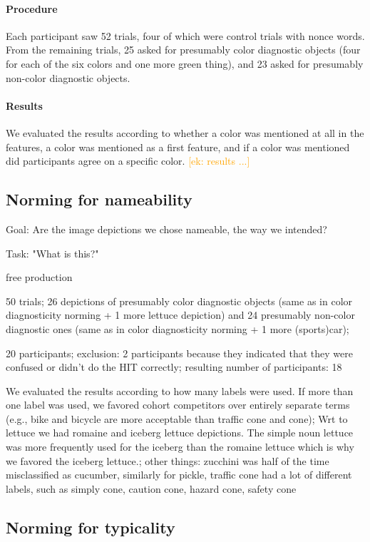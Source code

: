 \documentclass[a4paper,man,floatsintext,natbib,donotrepeattitle]{apa6}
\newcommand{\ek}[1]{\textcolor{Orange}{[ek: #1]}}
\begin{document}
\paragraph{Procedure}
Each participant saw 52 trials, four of which were control trials with nonce words. From the remaining trials, 25 asked for presumably color diagnostic objects (four for each of the six colors and one more green thing), and 23 asked for presumably non-color diagnostic objects.

\paragraph{Results}
We evaluated the results according to whether a color was mentioned at all in the features, a color was mentioned as a first feature, and if a color was mentioned did participants agree on a specific color.
\ek{results ...}


\subsection{Norming for nameability}

Goal: Are the image depictions we chose nameable, the way we intended?

Task: "What is this?"

free production

50 trials;
26 depictions of presumably color diagnostic objects (same as in color diagnosticity norming + 1 more lettuce depiction) and 24 presumably non-color diagnostic ones (same as in color diagnosticity norming + 1 more (sports)car);

20 participants;
exclusion: 2 participants because they indicated that they were confused or didn't do the HIT correctly;
resulting number of participants: 18

We evaluated the results according to how many labels were used. If more than one label was used, we favored cohort competitors over entirely separate terms (e.g., bike and bicycle are more acceptable than traffic cone and cone);
Wrt to lettuce we had romaine and iceberg lettuce depictions. The simple noun lettuce was more frequently used for the iceberg than the romaine lettuce which is why we favored the iceberg lettuce.; 
other things: zucchini was half of the time misclassified as cucumber, similarly for pickle, traffic cone had a lot of different labels, such as simply cone, caution cone, hazard cone, safety cone

\subsection{Norming for typicality}
\end{document}
